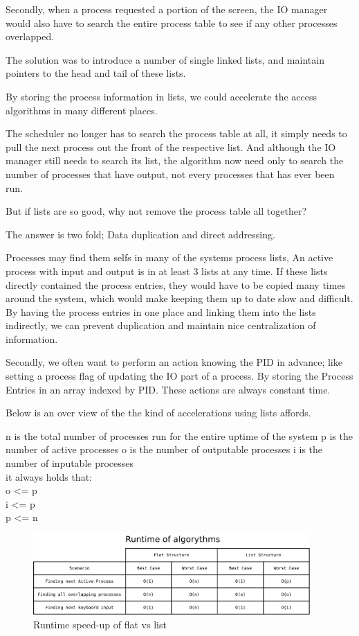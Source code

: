 \documentclass[a4paper]{report}
\begin{document}
Secondly, when a process requested a portion of the screen, the IO manager would also have to search the entire process table to see if any other processes overlapped.

The solution was to introduce a number of single linked lists, and maintain pointers to the head and tail of these lists.

By storing the process information in lists, we could accelerate the access algorithms in many different places.

The scheduler no longer has to search the process table at all, it simply needs to pull the next process out the front of the respective list. And although the IO manager still needs to search its list, the algorithm now need only to search the number of processes that have output, not every processes that has ever been run.

But if lists are so good, why not remove the process table all together?

The answer is two fold; Data duplication and direct addressing.

Processes may find them selfs in many of the systems process lists, An active process with input and output is in at least 3 lists at any time. If these lists directly contained the process entries, they would have to be copied many times around the system, which would make keeping them up to date slow and difficult. By having the process entries in one place and linking them into the lists indirectly, we can prevent duplication and maintain nice centralization of information.

Secondly, we often want to perform an action knowing the PID in advance; like setting a process flag of updating the IO part of a process. By storing the Process Entries in an array indexed by PID. These actions are always constant time.

Below is an over view of the the kind of accelerations using lists affords.

n is the total number of processes run for the entire uptime of the system
p is the number of active processes
o is the number of outputable processes
i is the number of inputable processes\\
it always holds that:\\
o \textless= p\\
i \textless= p\\
p \textless= n\\


\begin{figure}[ht]
\centering
\includegraphics[width=400px]{images/List_Speedup}
\caption{Runtime speed-up of flat vs list}
\label{fig:WinTitleBarScreen}
\end{figure}
\end{document}

